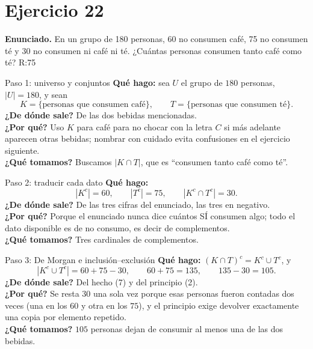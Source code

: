 \documentclass[11pt]{article}
\begin{document}
\newpage

\section*{Ejercicio 22}

\textbf{Enunciado.} En un grupo de 180 personas, 60 no consumen caf\'e, 75 no consumen t\'e y 30 no consumen ni caf\'e ni t\'e. ¿Cu\'antas personas consumen tanto caf\'e como t\'e? R:75

\begin{sol}

\begin{paso}{Paso 1: universo y conjuntos}
\textbf{Qu\'e hago:} sea $U$ el grupo de $180$ personas, $|U|=180$, y sean
\[
K=\{\text{personas que consumen caf\'e}\},\qquad T=\{\text{personas que consumen t\'e}\}.
\]
\textbf{¿De d\'onde sale?} De las dos bebidas mencionadas.\\
\textbf{¿Por qu\'e?} Uso $K$ para caf\'e para no chocar con la letra $C$ si m\'as adelante aparecen otras bebidas; nombrar con cuidado evita confusiones en el ejercicio siguiente.\\
\textbf{¿Qu\'e tomamos?} Buscamos $|K\cap T|$, que es ``consumen tanto caf\'e como t\'e''.
\end{paso}

\begin{paso}{Paso 2: traducir cada dato}
\textbf{Qu\'e hago:}
\[
|K^{c}| = 60,\qquad |T^{c}| = 75,\qquad |K^{c}\cap T^{c}| = 30 .
\]
\textbf{¿De d\'onde sale?} De las tres cifras del enunciado, las tres en negativo.\\
\textbf{¿Por qu\'e?} Porque el enunciado nunca dice cu\'antos S\'I consumen algo; todo el dato disponible es de no consumo, es decir de complementos.\\
\textbf{¿Qu\'e tomamos?} Tres cardinales de complementos.
\end{paso}

\begin{paso}{Paso 3: De Morgan e inclusi\'on--exclusi\'on}
\textbf{Qu\'e hago:} $(K\cap T)^{c} = K^{c}\cup T^{c}$, y
\[
|K^{c}\cup T^{c}| = 60 + 75 - 30, \qquad 60+75 = 135, \qquad 135 - 30 = 105 .
\]
\textbf{¿De d\'onde sale?} Del hecho (7) y del principio (2).\\
\textbf{¿Por qu\'e?} Se resta $30$ una sola vez porque esas personas fueron contadas dos veces (una en los $60$ y otra en los $75$), y el principio exige devolver exactamente una copia por elemento repetido.\\
\textbf{¿Qu\'e tomamos?} $105$ personas dejan de consumir al menos una de las dos bebidas.
\end{paso}


\end{sol}
\end{document}
